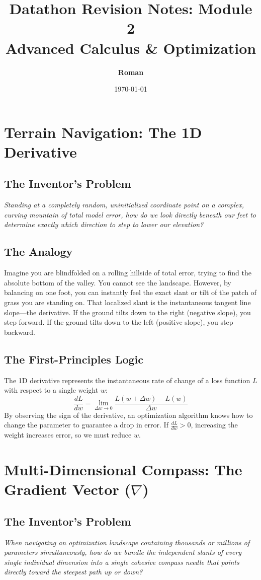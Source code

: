 \documentclass[12pt,a4paper]{article}
\title{\textbf{\color{primary}Datathon Revision Notes: Module 2 \\ Advanced Calculus \& Optimization}}
\author{\textbf{Roman}}
\date{\today}
\begin{document}
\color{darktext}
\maketitle

\section{Terrain Navigation: The 1D Derivative}
\subsection*{The Inventor's Problem}
\textit{Standing at a completely random, uninitialized coordinate point on a complex, curving mountain of total model error, how do we look directly beneath our feet to determine exactly which direction to step to lower our elevation?}

\subsection*{The Analogy}
Imagine you are blindfolded on a rolling hillside of total error, trying to find the absolute bottom of the valley. You cannot see the landscape. However, by balancing on one foot, you can instantly feel the exact slant or tilt of the patch of grass you are standing on. That localized slant is the instantaneous tangent line slope—the derivative. If the ground tilts down to the right (negative slope), you step forward. If the ground tilts down to the left (positive slope), you step backward.

\subsection*{The First-Principles Logic}
The 1D derivative represents the instantaneous rate of change of a loss function $L$ with respect to a single weight $w$:
$$\frac{dL}{dw} = \lim_{\Delta w \to 0} \frac{L(w + \Delta w) - L(w)}{\Delta w}$$
By observing the sign of the derivative, an optimization algorithm knows how to change the parameter to guarantee a drop in error. If $\frac{dL}{dw} > 0$, increasing the weight increases error, so we must reduce $w$.

\section{Multi-Dimensional Compass: The Gradient Vector ($\nabla$)}
\subsection*{The Inventor's Problem}
\textit{When navigating an optimization landscape containing thousands or millions of parameters simultaneously, how do we bundle the independent slants of every single individual dimension into a single cohesive compass needle that points directly toward the steepest path up or down?}
\end{document}
